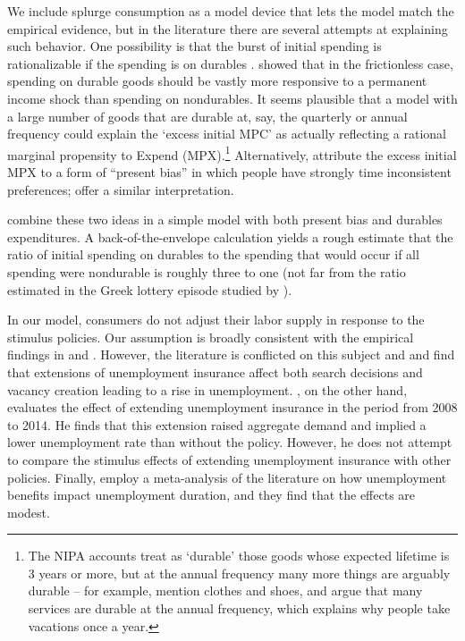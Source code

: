 \documentclass[\econtexRoot/HAFiscal]{subfiles}
\begin{document}
We include splurge consumption as a model device that lets the model match the empirical evidence, but in the literature there are several attempts at explaining such behavior. One possibility is that the burst of initial spending is rationalizable if the spending is on durables \citep{bcShocksStocks}.  \cite{mankiw:durgoods} showed that in the frictionless case, spending on durable goods should be vastly more responsive to a permanent income shock than spending on nondurables. It seems plausible that a model with a large number of goods that are durable at, say, the quarterly or annual frequency could explain the `excess initial MPC' as actually reflecting a rational marginal propensity to Expend (MPX).\footnote{The NIPA accounts treat as `durable' those goods whose expected lifetime is 3 years or more, but at the annual frequency many more things are arguably durable -- for example, \cite{bdTimeSeriesC} mention clothes and shoes, and \cite{hkpMemorable} argue that many services are durable at the annual frequency, which explains why people take vacations once a year.} Alternatively, \cite{indarte2024explains} attribute the excess initial MPX to a form of ``present bias'' in which people have strongly time inconsistent preferences; \cite{lmmPresentBias} offer a similar interpretation. 

\cite{laibson2022simple} combine these two ideas in a simple model with both present bias and durables expenditures.  A back-of-the-envelope calculation yields a rough estimate that the ratio of initial spending on durables to the spending that would occur if all spending were nondurable is roughly three to one (not far from the ratio estimated in the Greek lottery episode studied by \cite{kotsogiannisMPCs}).

In our model, consumers do not adjust their labor supply in response to the stimulus policies.  Our assumption is broadly consistent with the empirical findings in \cite{ganong2022spending} and \cite{chodorow2016limited}. However, the literature is conflicted on this subject and \cite{hagedorn2017impact} and \cite{hagedorn2019unemployment} find that extensions of unemployment insurance affect both search decisions and vacancy creation leading to a rise in unemployment. \cite{kekre2022unemp}, on the other hand, evaluates the effect of extending unemployment insurance in the period from 2008 to 2014. He finds that this extension raised aggregate demand and implied a lower unemployment rate than without the policy. However, he does not attempt to compare the stimulus effects of extending unemployment insurance with other policies. Finally, \cite{cohen2025disemployment} employ a meta-analysis of the literature on how unemployment benefits impact unemployment duration, and they find that the effects are modest. 
\end{document}
